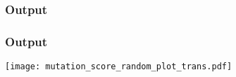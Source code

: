  \begin{frame}
    \frametitle{Output}
    \centering
    {\tiny }
  \end{frame}

  \begin{frame}
    \frametitle{Output}
    \centering
    \texttt{[image: mutation\_score\_random\_plot\_trans.pdf]}
  \end{frame}
